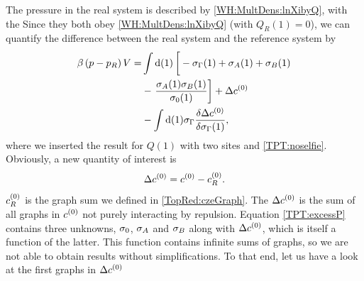 \documentclass[8.5pt,twoside,twocolumn]{article}
\newcommand\di{\te{d}}
\newcommand\cze{\enmat{c^{(0)}}}
\newcommand\inon{\enmat{\int\di(1)}}
\theoremstyle{standard}
\begin{document}
The pressure in the real system is described by \eqref{WH:MultDens:lnXibyQ}, with the  
Since they both obey \eqref{WH:MultDens:lnXibyQ} (with $Q_R(1)=0$), we can quantify the difference
between the real system and the reference system by
\begin{equation}
\begin{aligned}
\be \rb{p-p_R}V =& \inon \lt[\vphantom{\frac 1 2}-\siga(1)+\si_A(1)+\si_B(1)\rt.\\
&-\lt.\frac{\si_A(1)\si_B(1)}{\siz(1)}\rt] + \Dl\cze \\
&- \inon\siga\delti{\Dl\cze}{\siga(1)},
\end{aligned}
\label{TPT:excessP}
\end{equation}
where we inserted the result for $Q(1)$ with two sites and \eqref{TPT:noselfie}. Obviously, a new
quantity of interest is
\newcommand\chs{\enmat{\cze_{R}}}
\newcommand\dc{\enmat{\Dl\cze}}
\begin{equation}
\dc=\cze-\chs.
\end{equation}
$\chs$ is the graph sum we defined in \eqref{TopRed:czeGraph}. The $\Dl\cze$ is the sum of all
graphs in $\cze$ not purely interacting by repulsion. Equation \eqref{TPT:excessP} contains
three unknowns, $\sigma_0$, $\sigma_A$ and $\sigma_B$ along with $\dc$, which is itself a function
of the latter. This function contains infinite sums of graphs, so we are not able to obtain
results without simplifications. To that end, let us have a look at the first graphs
in $\dc$
\newcommand\twograph[2]{
  \draw(0,0) node[circle,minimum size=.8cm,fill=white,draw] (1) {};
  \draw(0,.15) node[circle,inner sep=0cm,minimum size=.1cm,fill=black,draw] (1A) {};
  \draw(0,-.15) node[circle,inner sep=0cm,minimum size=.1cm,fill=black,draw] (1B) {.};
  \node at (.5,-.5) {#1};
  \draw(1.5,0) node[circle,minimum size=.8cm,fill=white,draw] (2) {};
  \draw(1.5,.15) node[circle,inner sep=0cm,minimum size=.1cm,fill=black,draw] (2A) {};
  \draw(1.5,-.15) node[circle,inner sep=0cm,minimum size=.1cm,fill=black,draw] (2B) {.};
  \node at (2.0,-.5) {#2};
}
\newcommand\threegraph[3]{
  \draw(0,0) node[circle,minimum size=.8cm,fill=white,draw] (1) {};
  \draw(0,.15) node[circle,inner sep=0cm,minimum size=.1cm,fill=black,draw] (1A) {};
  \draw(0,-.15) node[circle,inner sep=0cm,minimum size=.1cm,fill=black,draw] (1B) {.};
  \node at (.5,-.5) {#1};
  \draw(1.5,0) node[circle,minimum size=.8cm,fill=white,draw] (2) {};
  \draw(1.5,.15) node[circle,inner sep=0cm,minimum size=.1cm,fill=black,draw] (2A) {};
  \draw(1.5,-.15) node[circle,inner sep=0cm,minimum size=.1cm,fill=black,draw] (2B) {.};
  \node at (2.0,-.5) {#2};
  \draw(.75,1.3) node[circle,minimum size=.8cm,fill=white,draw] (3) {};
  \draw(.75,1.45) node[circle,inner sep=0cm,minimum size=.1cm,fill=black,draw] (3A) {};
  \draw(.75,1.15) node[circle,inner sep=0cm,minimum size=.1cm,fill=black,draw] (3B) {.};
  \node at (1.25,.8) {#3};
}
\end{document}
